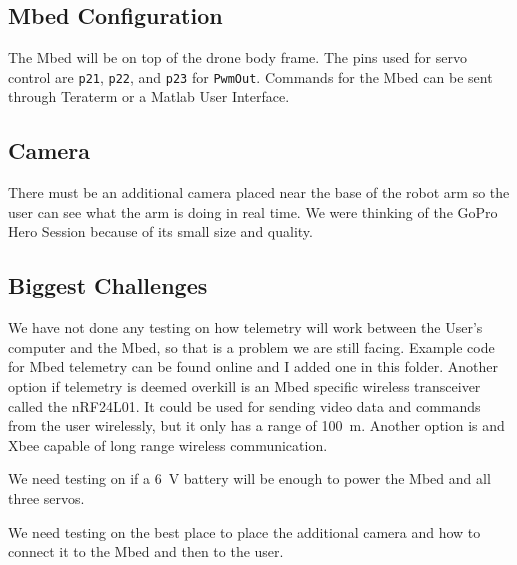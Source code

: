 \subsection{Mbed Configuration}
The Mbed will be on top of the drone body frame. The pins used for servo control are \lstinline{p21}, \lstinline{p22}, and \lstinline{p23} for \lstinline{PwmOut}. Commands for the Mbed can be sent through Teraterm or a Matlab User Interface. 

\subsection{Camera}
There must be an additional camera placed near the base of the robot arm so the user can see what the arm is doing in real time. We were thinking of the GoPro Hero Session because of its small size and quality. 

\subsection{Biggest Challenges}
We have not done any testing on how telemetry will work between the User’s computer and the Mbed, so that is a problem we are still facing. Example code for Mbed telemetry can be found online and I added one in this folder. Another option if telemetry is deemed overkill is an Mbed specific wireless transceiver called the nRF24L01. It could be used for sending video data and commands from the user wirelessly, but it only has a range of \SI{100}{\meter}. Another option is and Xbee capable of long range wireless communication.

We need testing on if a \SI{6}{\volt} battery will be enough to power the Mbed and all three servos. 

We need testing on the best place to place the additional camera and how to connect it to the Mbed and then to the user.